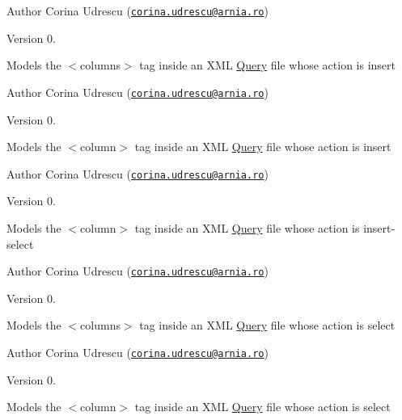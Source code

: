 \begin{DoxyAuthor}{Author}
Corina Udrescu (\href{mailto:corina.udrescu@arnia.ro}{\tt corina.\+udrescu@arnia.\+ro})  
\end{DoxyAuthor}
\begin{DoxyVersion}{Version}
0.
\end{DoxyVersion}
Models the $<$columns$>$ tag inside an X\+M\+L \hyperlink{classQuery}{Query} file whose action is \textquotesingle{}insert\textquotesingle{}

\begin{DoxyAuthor}{Author}
Corina Udrescu (\href{mailto:corina.udrescu@arnia.ro}{\tt corina.\+udrescu@arnia.\+ro})  
\end{DoxyAuthor}
\begin{DoxyVersion}{Version}
0.
\end{DoxyVersion}
Models the $<$column$>$ tag inside an X\+M\+L \hyperlink{classQuery}{Query} file whose action is \textquotesingle{}insert\textquotesingle{}

\begin{DoxyAuthor}{Author}
Corina Udrescu (\href{mailto:corina.udrescu@arnia.ro}{\tt corina.\+udrescu@arnia.\+ro})  
\end{DoxyAuthor}
\begin{DoxyVersion}{Version}
0.
\end{DoxyVersion}
Models the $<$column$>$ tag inside an X\+M\+L \hyperlink{classQuery}{Query} file whose action is \textquotesingle{}insert-\/select\textquotesingle{}

\begin{DoxyAuthor}{Author}
Corina Udrescu (\href{mailto:corina.udrescu@arnia.ro}{\tt corina.\+udrescu@arnia.\+ro})  
\end{DoxyAuthor}
\begin{DoxyVersion}{Version}
0.
\end{DoxyVersion}
Models the $<$columns$>$ tag inside an X\+M\+L \hyperlink{classQuery}{Query} file whose action is \textquotesingle{}select\textquotesingle{}

\begin{DoxyAuthor}{Author}
Corina Udrescu (\href{mailto:corina.udrescu@arnia.ro}{\tt corina.\+udrescu@arnia.\+ro})  
\end{DoxyAuthor}
\begin{DoxyVersion}{Version}
0.
\end{DoxyVersion}
Models the $<$column$>$ tag inside an X\+M\+L \hyperlink{classQuery}{Query} file whose action is \textquotesingle{}select\textquotesingle{}

